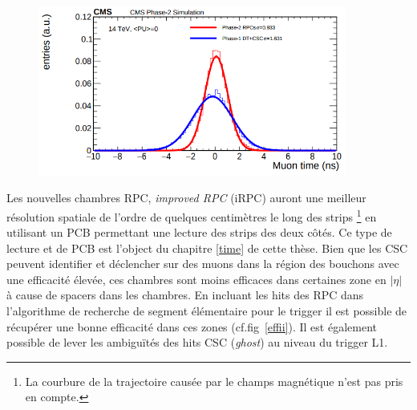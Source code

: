 \begin{itemize}[label=$\bullet$]
	\begin{figure}[ht!]
		\centering
		\includegraphics[width=0.90\textwidth]{RPC/intrasec.png}
		\label{intrasec}
	\end{figure}
	Les nouvelles chambres RPC, \textit{improved RPC} (iRPC) auront une meilleur résolution spatiale de l'ordre de quelques centimètres le long des strips \footnote{La courbure de la trajectoire causée par le champs magnétique n'est pas pris en compte.} en utilisant un PCB permettant une lecture des strips des deux côtés. Ce type de lecture et de PCB est l'object du chapitre \ref{time} de cette thèse.
	\newpage
	Bien que les CSC peuvent identifier et déclencher sur des muons dans la région des bouchons avec une efficacité élevée, ces chambres sont moins efficaces dans certaines zone en $|\eta|$ à cause de spacers dans les chambres. En incluant les hits des RPC dans l'algorithme de recherche de segment élémentaire pour le trigger il est possible de récupérer une bonne efficacité dans ces zones (cf.fig~\ref{effii}). Il est également possible de lever les ambiguïtés des hits CSC (\textit{ghost})  au niveau du trigger L1.
	

\end{itemize}

